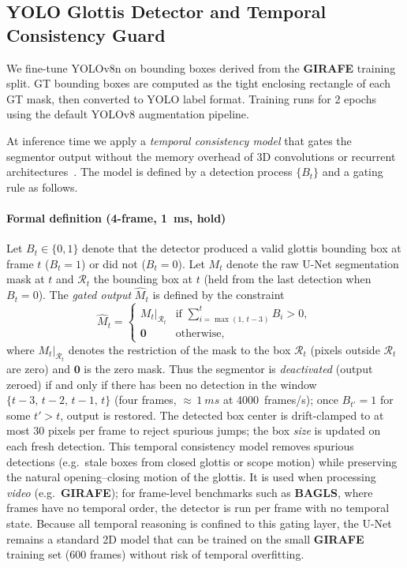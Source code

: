 \documentclass[preprint,12pt]{elsarticle}
\newcommand{\girafe}{\textbf{GIRAFE}}
\newcommand{\bagls}{\textbf{BAGLS}}
\begin{document}
\subsection{YOLO Glottis Detector and Temporal Consistency Guard}
\label{sec:yolo}

We fine-tune YOLOv8n \cite{jocher2023yolo} on bounding boxes derived from
the \girafe{} training split.
GT bounding boxes are computed as the tight enclosing rectangle of each GT
mask, then converted to YOLO label format.
Training runs for \num{2} epochs using the default YOLOv8 augmentation
pipeline.

At inference time we apply a \emph{temporal consistency model} that gates
the segmentor output without the memory overhead of 3D convolutions or
recurrent architectures~\cite{fehling2020convlstm}.
The model is defined by a detection process $\{B_t\}$ and a gating rule as
follows.

\paragraph{Formal definition (4-frame, \SI{1}{ms}, hold)}
Let $B_t \in \{0,1\}$ denote that the detector produced a valid glottis
bounding box at frame $t$ ($B_t=1$) or did not ($B_t=0$).
Let $M_t$ denote the raw U-Net segmentation mask at $t$ and
$\mathcal{R}_t$ the bounding box at $t$ (held from the last detection when
$B_t=0$).
The \emph{gated output} $\widehat{M}_t$ is defined by the constraint
\begin{equation}
  \widehat{M}_t =
  \begin{cases}
    M_t \big|_{\mathcal{R}_t} & \text{if } \sum_{i=\max(1,\,t-3)}^{t} B_i > 0, \\
    \mathbf{0} & \text{otherwise},
  \end{cases}
\end{equation}
where $M_t|_{\mathcal{R}_t}$ denotes the restriction of the mask to the
box $\mathcal{R}_t$ (pixels outside $\mathcal{R}_t$ are zero) and
$\mathbf{0}$ is the zero mask.
Thus the segmentor is \emph{deactivated} (output zeroed) if and only if
there has been no detection in the window $\{t-3,\,t-2,\,t-1,\,t\}$ (four
frames, $\approx\,\SI{1}{ms}$ at \SI{4000}{frames/s}); once
$B_{t'}=1$ for some $t'>t$, output is restored.
The detected box center is drift-clamped to at most \num{30} pixels per
frame to reject spurious jumps; the box \emph{size} is updated on each
fresh detection.
This temporal consistency model removes spurious detections (e.g.\ stale
boxes from closed glottis or scope motion) while preserving the natural
opening--closing motion of the glottis.
It is used when processing \emph{video} (e.g.\ \girafe{}); for frame-level
benchmarks such as \bagls{}, where frames have no temporal order, the
detector is run per frame with no temporal state.
Because all temporal reasoning is confined to this gating layer, the
U-Net remains a standard 2D model that can be trained on the small
\girafe{} training set (\num{600} frames) without risk of temporal
overfitting.
\label{sec:temporal_detector}
\end{document}
